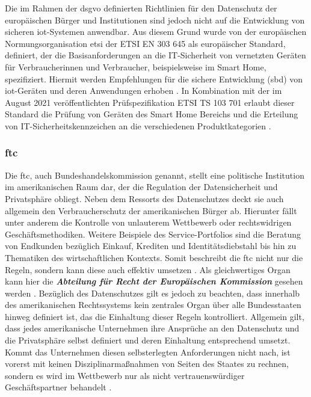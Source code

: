 Die im Rahmen der \ac{dsgvo} definierten Richtlinien für den Datenschutz der europäischen Bürger und Institutionen sind jedoch nicht auf die Entwicklung von sicheren \ac{iot}-Systemen anwendbar. Aus diesem Grund wurde von der europäischen Normungsorganisation \acl{etsi} der ETSI EN 303 645 als europäischer Standard, definiert, der die Basisanforderungen an die IT-Sicherheit von vernetzten Geräten für Verbraucherinnen und Verbraucher, beispielsweise im Smart Home, spezifiziert. 
Hiermit werden Empfehlungen für die sichere Entwicklung (\acl{sbd}) von \ac{iot}-Geräten und deren Anwendungen erhoben \cite{BSI2020}. In Kombination mit der im August 2021 veröffentlichten Prüfspezifikation ETSI TS 103 701 erlaubt dieser Standard die Prüfung von Geräten des Smart Home Bereichs und die Erteilung von IT-Sicherheitskennzeichen an die verschiedenen Produktkategorien \cite{BSI2022}.

\subsubsection{\acl{ftc}}
\label{sec:Grundlagen:ssec:Rechtliche Rahmenbedingungen:sssec:FTC}

Die \acl{ftc}, auch Bundeshandelskommission genannt, stellt eine politische Institution im amerikanischen Raum dar, der die Regulation der Datensicherheit und Privatsphäre obliegt. Neben dem Ressorts des Datenschutzes deckt sie auch allgemein den Verbraucherschutz der amerikanischen Bürger ab. 
Hierunter fällt unter anderem die Kontrolle von unlauterem Wettbewerb oder rechtswidrigen Geschäftsmethodiken. Weitere Beispiele des Service-Portfolios sind die Beratung von Endkunden bezüglich Einkauf, Krediten und Identitätsdiebstahl bis hin zu Thematiken des wirtschaftlichen Kontexts. 
Somit beschreibt die \ac{ftc} nicht nur die Regeln, sondern kann diese auch effektiv umsetzen \cite{FTC}. Als gleichwertiges Organ kann hier die \textbf{\textit{Abteilung für Recht der Europäischen Kommission}} gesehen werden \cite{FTCEU}. Bezüglich des Datenschutzes gilt es jedoch zu beachten, dass innerhalb des amerikanischen Rechtssystems kein zentrales Organ über alle Bundesstaaten hinweg definiert ist, das die Einhaltung dieser Regeln kontrolliert. 
Allgemein gilt, dass jedes amerikanische Unternehmen ihre Ansprüche an den Datenschutz und die Privatsphäre selbst definiert und deren Einhaltung entsprechend umsetzt. Kommt das Unternehmen diesen selbsterlegten Anforderungen nicht nach, ist vorerst mit keinen Disziplinarmaßnahmen von Seiten des Staates zu rechnen, sondern es wird im Wettbewerb nur als nicht vertrauenswürdiger Geschäftspartner behandelt \cite{DatenschutzOrg2022}.

